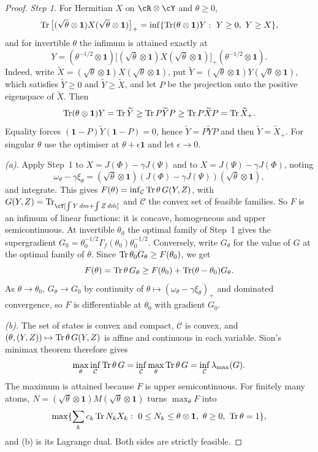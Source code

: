 \begin{proof}
\emph{Step 1.} For Hermitian $X$ on $\cR\otimes\cY$ and $\theta\ge0$,
\[
\operatorname{Tr}\big[(\sqrt\theta\otimes\mathbf 1)X(\sqrt\theta\otimes\mathbf 1)\big]_+=\inf\{\operatorname{Tr}(\theta\otimes\mathbf 1)Y:\ Y\ge0,\ Y\ge X\},
\]
and for invertible $\theta$ the infimum is attained exactly at
\[
Y=(\theta^{-1/2}\otimes\mathbf 1)\big[(\sqrt\theta\otimes\mathbf 1)X(\sqrt\theta\otimes\mathbf 1)\big]_+(\theta^{-1/2}\otimes\mathbf 1).
\]
Indeed, write $\widetilde X=(\sqrt\theta\otimes\mathbf 1)X(\sqrt\theta\otimes\mathbf 1)$, put $\widetilde Y=(\sqrt\theta\otimes\mathbf 1)Y(\sqrt\theta\otimes\mathbf 1)$, which satisfies $\widetilde Y\ge0$ and $\widetilde Y\ge\widetilde X$, and let $P$ be the projection onto the positive eigenspace of $\widetilde X$. Then
\[
\operatorname{Tr}(\theta\otimes\mathbf 1)Y=\operatorname{Tr}\widetilde Y\ge\operatorname{Tr} P\widetilde YP\ge\operatorname{Tr} P\widetilde XP=\operatorname{Tr}\widetilde X_+.
\]
Equality forces $(\mathbf 1-P)\widetilde Y(\mathbf 1-P)=0$, hence $\widetilde Y=P\widetilde YP$ and then $\widetilde Y=\widetilde X_+$. For singular $\theta$ use the optimiser at $\theta+\epsilon\mathbf 1$ and let $\epsilon\to0$.

\emph{(a).} Apply Step~1 to $X=J(\Phi)-\gamma J(\Psi)$ and to $X=J(\Psi)-\gamma J(\Phi)$, noting
\[
\omega_\theta-\gamma\xi_\theta=(\sqrt\theta\otimes\mathbf 1)(J(\Phi)-\gamma J(\Psi))(\sqrt\theta\otimes\mathbf 1),
\]
and integrate. This gives $F(\theta)=\inf_{\mathcal C}\operatorname{Tr}\theta\,G(Y,Z)$, with $G(Y,Z)=\Tr_\cY[\int Y\,dm+\int Z\,d\tilde m]$ and $\mathcal C$ the convex set of feasible families. So $F$ is an infimum of linear functions: it is concave, homogeneous and upper semicontinuous. At invertible $\theta_0$ the optimal family of Step~1 gives the supergradient $G_0=\theta_0^{-1/2}\Gamma_f(\theta_0)\theta_0^{-1/2}$. Conversely, write $G_\theta$ for the value of $G$ at the optimal family of $\theta$. Since $\operatorname{Tr}\theta_0G_\theta\ge F(\theta_0)$, we get
\[
F(\theta)=\operatorname{Tr}\theta\,G_\theta\ge F(\theta_0)+\operatorname{Tr}(\theta-\theta_0)G_\theta.
\]
As $\theta\to\theta_0$, $G_\theta\to G_0$ by continuity of $\theta\mapsto(\omega_\theta-\gamma\xi_\theta)_+$ and dominated convergence, so $F$ is differentiable at $\theta_0$ with gradient $G_0$.

\emph{(b).} The set of states is convex and compact, $\mathcal C$ is convex, and $(\theta,(Y,Z))\mapsto\operatorname{Tr}\theta\,G(Y,Z)$ is affine and continuous in each variable. Sion's minimax theorem therefore gives
\[
\max_\theta\inf_{\mathcal C}\operatorname{Tr}\theta\,G=\inf_{\mathcal C}\max_\theta\operatorname{Tr}\theta\,G=\inf_{\mathcal C}\lambda_{\max}(G).
\]
The maximum is attained because $F$ is upper semicontinuous. For finitely many atoms, $N=(\sqrt\theta\otimes\mathbf 1)M(\sqrt\theta\otimes\mathbf 1)$ turns $\max_\theta F$ into
\[
\max\{\sum_kc_k\operatorname{Tr} N_kX_k:\ 0\le N_k\le\theta\otimes\mathbf 1,\ \theta\ge0,\ \operatorname{Tr}\theta=1\},
\]
and (b) is its Lagrange dual. Both sides are strictly feasible.


\end{proof}
